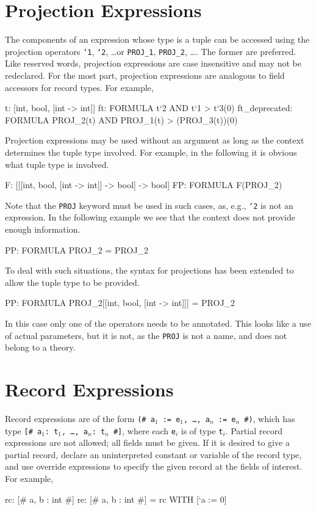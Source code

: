 \section{Projection Expressions}\label{projection-exprs}

The components of an expression whose type is a tuple can be accessed
using the projection operators \texttt{`1}, \texttt{`2}, \ldots or
\texttt{PROJ\_1}, \texttt{PROJ\_2}, \ldots.  The former are preferred.
Like reserved words, projection expressions are case insensitive and may
not be redeclared.  For the most part, projection expressions are
analogous to field accessors for record types.  For example,
\begin{pvsex}
  t: [int, bool, [int -> int]]
  ft: FORMULA t`2 AND t`1 > t`3(0)
  ft_deprecated: FORMULA PROJ_2(t) AND PROJ_1(t) > (PROJ_3(t))(0)
\end{pvsex}

Projection expressions may be used without an argument as long as the
context determines the tuple type involved.  For example, in the following
it is obvious what tuple type is involved.
\begin{pvsex}
  F: [[[int, bool, [int -> int]] -> bool] -> bool]
  FP: FORMULA F(PROJ_2)
\end{pvsex}
Note that the \texttt{PROJ} keyword must be used in such cases, as, e.g.,
\texttt{`2} is not an expression.  In the following example we see that
the context does not provide enough information.
\begin{pvsex}
  PP: FORMULA PROJ_2 = PROJ_2
\end{pvsex}
To deal with such situations, the syntax for projections has been extended
to allow the tuple type to be provided.
\begin{pvsex}
  PP: FORMULA PROJ_2[[int, bool, [int -> int]]] = PROJ_2
\end{pvsex}
In this case only one of the operators needs to be annotated.  This looks
like a use of actual parameters, but it is not, as the \texttt{PROJ} is
not a name, and does not belong to a theory.


\section{Record Expressions}\label{record-expressions}

Record expressions are of the form \texttt{(\# a$_1$ := e$_1$, \ldots,
a$_n$ := e$_n$ \#)}, which has type \texttt{[\# a$_1$:\ t$_1$, \ldots,
a$_n$:\ t$_n$ \#]}, where each \texttt{e$_i$} is of type \texttt{t$_i$}.
Partial record expressions are not allowed; all fields must be given.  If
it is desired to give a partial record, declare an uninterpreted constant
or variable of the record type, and use override expressions to specify
the given record at the fields of interest.  For example,
\begin{pvsex}
  rc: [# a, b : int #]
  re: [# a, b : int #] = rc WITH [`a := 0]
\end{pvsex}

